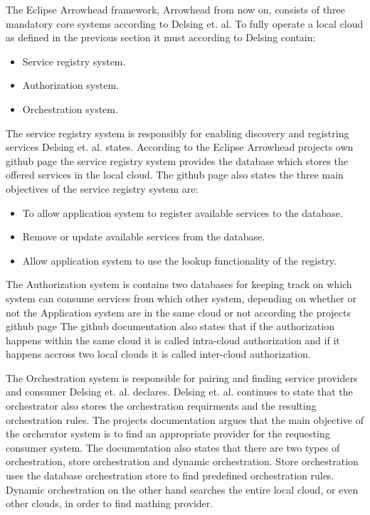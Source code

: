 The Eclipse Arrowhead framework, Arrowhead from now on, consists of three mandatory core systems according to Delsing et. al. \cite{Delsing2017}
To fully operate a local cloud as defined in the previous section it must according to Delsing \cite{Delsing2017} contain:
\begin{itemize}
    \item Service registry system.
    \item Authorization system. 
    \item Orchestration system.
\end{itemize}
The service registry system is responsibly for enabling discovery and registring services Delsing et. al. \cite{Delsing2017} states. 
According to the Eclipse Arrowhead projects own github page \cite{Github2021} the service registry system provides the database which stores the offered services in the local cloud.
The github page also states the three main objectives of the service registry system are:
\begin{itemize}
    \item To allow application system to register available services to the database. 
    \item Remove or update available services from the database.
    \item Allow application system to use the lookup functionality of the registry.
\end{itemize}
The Authorization system is contains two databases for keeping track on which system can consume services from which other system, depending on whether or not the Application system are in the same cloud or not according the projects github page \cite{Github2021}
The github documentation also states that if the authorization happens within the same cloud it is called intra-cloud authorization and if it happens accross two local clouds it is called inter-cloud authorization. \cite{Github2021}

The Orchestration system is responsible for pairing and finding service providers and consumer Delsing et. al. declares. \cite{Delsing2017} 
Delsing et. al. continues to state that the orchestrator also stores the orchestration requirments and the resulting orchestration rules. \cite{Delsing2017} 
The projects documentation argues that the main objective of the orcherator system is to find an appropriate provider for the requesting consumer system. \cite{Github2021}
The documentation also states that there are two types of orchestration, store orchestration and dynamic orchestration.
Store orchestration uses the database orchestration store to find predefined orchestration rules.
Dynamic orchestration on the other hand searches the entire local cloud, or even other clouds, in order to find mathing provider. \cite{Github2021}

